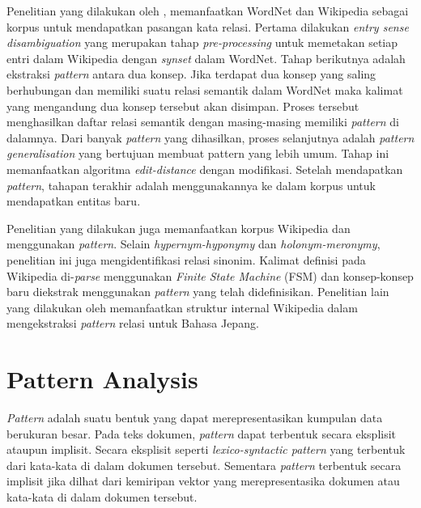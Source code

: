 Penelitian yang dilakukan oleh \cite{ruiz2005automatic}, memanfaatkan WordNet dan Wikipedia sebagai korpus untuk mendapatkan pasangan kata relasi. Pertama dilakukan \textit{entry sense disambiguation} yang merupakan tahap \textit{pre-processing} untuk memetakan setiap entri dalam Wikipedia dengan \textit{synset} dalam WordNet. Tahap berikutnya adalah ekstraksi \textit{pattern} antara dua konsep. Jika terdapat dua konsep yang saling berhubungan dan memiliki suatu relasi semantik dalam WordNet maka kalimat yang mengandung dua konsep tersebut akan disimpan. Proses tersebut menghasilkan daftar relasi semantik dengan masing-masing memiliki \textit{pattern} di dalamnya. Dari banyak \textit{pattern} yang dihasilkan, proses selanjutnya adalah \textit{pattern generalisation} yang bertujuan membuat pattern yang lebih umum. Tahap ini memanfaatkan algoritma \textit{edit-distance} dengan modifikasi. Setelah mendapatkan \textit{pattern}, tahapan terakhir adalah menggunakannya ke dalam korpus untuk mendapatkan entitas baru.

Penelitian yang dilakukan \cite{arnold2014extracting} juga memanfaatkan korpus Wikipedia dan menggunakan \textit{pattern}. Selain \textit{hypernym-hyponymy} dan \textit{holonym-meronymy}, penelitian ini juga mengidentifikasi relasi sinonim. Kalimat definisi pada Wikipedia di-\textit{parse} menggunakan \textit{Finite State Machine} (FSM) dan konsep-konsep baru diekstrak menggunakan \textit{pattern} yang telah didefinisikan. Penelitian lain yang dilakukan oleh \cite{sumida2008hacking} memanfaatkan struktur internal Wikipedia dalam mengekstraksi \textit{pattern} relasi untuk Bahasa Jepang. 


\section{Pattern Analysis}
\textit{Pattern} adalah suatu bentuk yang dapat merepresentasikan kumpulan data berukuran besar. Pada teks dokumen, \textit{pattern} dapat terbentuk secara eksplisit ataupun implisit. Secara eksplisit seperti \textit{lexico-syntactic pattern} yang terbentuk dari kata-kata di dalam dokumen tersebut. Sementara \textit{pattern} terbentuk secara implisit jika dilhat dari kemiripan vektor yang merepresentasika dokumen atau kata-kata di dalam dokumen tersebut.


